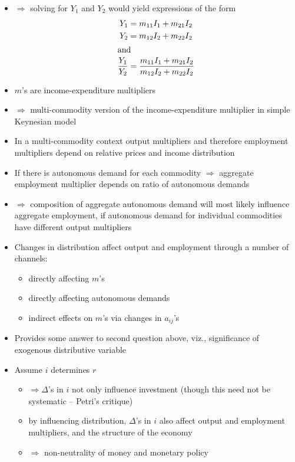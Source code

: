 \documentclass{article}
\begin{document}
\begin{itemize}
		\item \( \Rightarrow \) solving for \( Y_1 \) and \( Y_2 \) would yield expressions of the form
		\begin{align}
			Y_1 &= m_{11}I_1 + m_{21}I_2 \notag\\
			Y_2 &= m_{12}I_2 + m_{22}I_2 \notag\\
			\intertext{and}
			\frac{Y_1}{Y_2} &= \frac{m_{11}I_1 + m_{21}I_2}{m_{12}I_2 + m_{22}I_2}
		\end{align}
		\item \( m \)'s are income-expenditure multipliers
		\item \textcolor{myred}{\( \Rightarrow \) multi-commodity version of the income-expenditure multiplier in simple Keynesian model}
		\item In a multi-commodity context output multipliers and therefore employment multipliers depend on relative prices and income distribution
		\item If there is autonomous demand for each commodity \( \Rightarrow \) aggregate employment multiplier depends on ratio of autonomous demands
		\item \( \Rightarrow \) composition of aggregate autonomous demand will most likely influence aggregate employment, if autonomous demand for individual commodities have different output multipliers
		\item Changes in distribution affect output and employment through a number of channels:
		\begin{itemize}
			\item directly affecting \( m \)'s
			\item directly affecting autonomous demands
			\item indirect effects on \( m \)'s via changes in \( a_{ij} \)'s
		\end{itemize}
		\item Provides some answer to second question above, viz., significance of exogenous distributive variable
		\item Assume \( i \) determines \( r \)
		\begin{itemize}
			\item \( \Rightarrow \Delta \)'s in \( i \) not only influence investment (though this need not be systematic -- Petri's critique)
			\item by influencing distribution, \( \Delta \)'s in \( i \) also affect output and employment multipliers, and the structure of the economy
			\item \textcolor{myred}{\( \Rightarrow \) non-neutrality of money and monetary policy}
		\end{itemize}
	\end{itemize}
\end{document}
